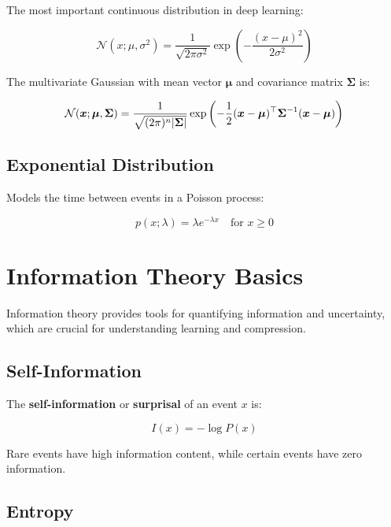 The most important continuous distribution in deep learning:

\begin{equation}
\mathcal{N}(x; \mu, \sigma^2) = \frac{1}{\sqrt{2\pi\sigma^2}} \exp\left(-\frac{(x-\mu)^2}{2\sigma^2}\right)
\end{equation}

The multivariate Gaussian with mean vector $\boldsymbol{\mu}$ and covariance matrix $\boldsymbol{\Sigma}$ is:

\begin{equation}
\mathcal{N}(\boldsymbol{x}; \boldsymbol{\mu}, \boldsymbol{\Sigma}) = \frac{1}{\sqrt{(2\pi)^n |\boldsymbol{\Sigma}|}} \exp\left(-\frac{1}{2}(\boldsymbol{x}-\boldsymbol{\mu})^\top \boldsymbol{\Sigma}^{-1} (\boldsymbol{x}-\boldsymbol{\mu})\right)
\end{equation}

\subsection{Exponential Distribution}

Models the time between events in a Poisson process:

\begin{equation}
p(x; \lambda) = \lambda e^{-\lambda x} \quad \text{for } x \geq 0
\end{equation}

\section{Information Theory Basics}
\label{sec:information-theory}

Information theory provides tools for quantifying information and uncertainty, which are crucial for understanding learning and compression.

\subsection{Self-Information}

The \textbf{self-information} or \textbf{surprisal} of an event $x$ is:

\begin{equation}
I(x) = -\log P(x)
\end{equation}

Rare events have high information content, while certain events have zero information.

\subsection{Entropy}

